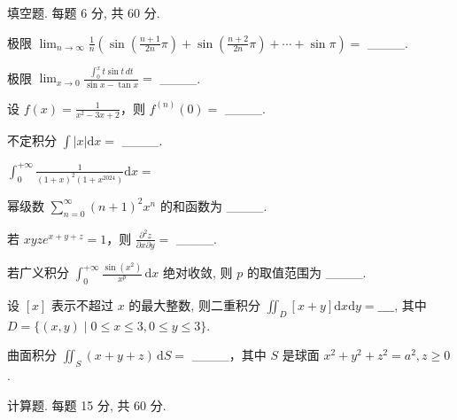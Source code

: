 \par{}
填空题. 每题 6 分, 共 60 分.\par
极限  $\lim_{n\to\infty}\frac{1}{n}\left(\sin\left(\frac{n+1}{2n}\pi\right)+\sin\left(\frac{n+2}{2n}\pi\right)+\cdots+\sin\pi\right)=$  \_\_\_\_.\par
极限  $\lim_{x\to0}\frac{\int_{0}^{x}t\sin t\,dt}{\sin x-\tan x}=$  \_\_\_\_.\par
设 $f(x) = \frac{1}{x^2 - 3x + 2}$，则 $f^{(n)}(0) =$ \_\_\_\_.\par
不定积分 $\int |x|\mathrm{d}x =$ \_\_\_\_.\par
$\int_{0}^{+\infty}\frac{1}{(1 + x)^{2}(1 + x^{2024})}\mathrm{d}x =$\par
幂级数  $\sum_{n=0}^{\infty}(n+1)^{2}x^{n}$  的和函数为 \_\_\_\_.\par
若 $xyz e^{x + y + z} = 1$，则 $\frac{\partial^2z}{\partial x\partial y} =$ \_\_\_\_.\par
若广义积分 $\int_0^{+\infty} \frac{\sin(x^2)}{x^p} \, \mathrm{d}x$ 绝对收敛, 则 $p$ 的取值范围为 \_\_\_\_.\par
设 $[x]$ 表示不超过 $x$ 的最大整数, 则二重积分 $\iint_{D} [x + y] \mathrm{d} x \mathrm{d} y = \_\_\_\_$, 其中 $D = \{(x, y) \mid 0 \leq x \leq 3, 0 \leq y \leq 3\}$.\par
曲面积分 $\iint_{S} (x + y + z) \, \mathrm{d}S =$ \_\_\_\_，其中 $S$ 是球面 $x^{2} + y^{2} + z^{2} = a^{2}, z \geq 0$.\par
\par{}
计算题. 每题 15 分, 共 60 分.\par
